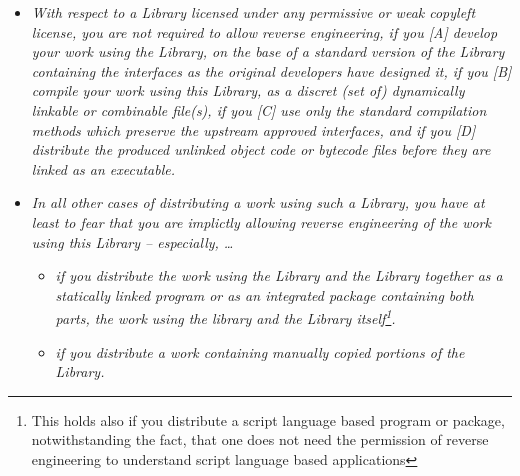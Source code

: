 \begin{itemize}
  \item \emph{With respect to a Library licensed under any permissive or weak
  copyleft license, you are not required to allow reverse engineering, if you
  [A] develop your work using the Library, on the base of a standard version of
  the Library containing the interfaces as the original developers have designed it,
  if you [B] compile your work using this Library, as a discret (set of)
  dynamically linkable or combinable file(s), if you [C] use only the standard
  compilation methods which preserve the upstream approved interfaces, and if
  you [D] distribute the produced unlinked object code or bytecode files before
  they are linked as an executable.}
  \item \emph{In all other cases of distributing a work using such a Library,
  you have at least to fear that you are implictly allowing reverse engineering
  of the work using this Library -- especially, \ldots}
  \begin{itemize}
    \item \emph{if you distribute the work using the Library and the Library
    together as a statically linked program or as an integrated package
    containing both parts, the work using the library and the Library
    itself\footnote{This holds also if you distribute a script language based
    program or package, notwithstanding the fact, that one does not need the
    permission of reverse engineering to understand script language based
    applications}.}
    \item \emph{if you distribute a work containing manually copied portions of
    the Library.}
  \end{itemize}
\end{itemize}



